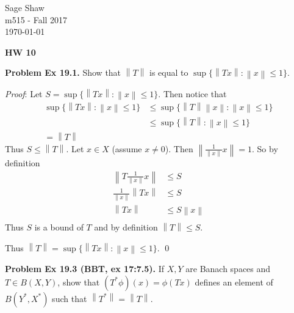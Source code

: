 \documentclass[12pt]{article}
\newcommand{\problem}[1]{\hspace{-4 ex} \large \textbf{Problem #1} }
\newcommand{\norm}[1]{\left\lVert#1\right\rVert}
\renewenvironment{proof}{\hspace{-4 ex} \emph{Proof}:}{\qed}
\begin{document}
	\thispagestyle{empty}
	
	\begin{flushright}
		Sage Shaw \\
		m515 - Fall 2017 \\
		\today
	\end{flushright}
	
{\large \textbf{HW 10}}\bigbreak

\problem{Ex 19.1.} Show that $\norm{T}$ is equal to $\sup\{\norm{Tx}:\norm{x}\leq1\}$. \bigbreak

	\begin{proof}
		Let $S = \sup\{\norm{Tx}:\norm{x}\leq1\}$. Then notice that
		\begin{align*}
			\sup\{\norm{Tx}:\norm{x}\leq1\} & \leq \sup\{\norm{T}\norm{x}:\norm{x}\leq1\} \\
			& \leq \sup\{\norm{T}:\norm{x}\leq1\} \\
			= \norm{T}
		\end{align*}
		Thus $S \leq \norm{T}$. \bigbreak
		Let $x \in X$ (assume $x \neq 0$). Then $\norm{\tfrac{1}{\norm{x}}x} = 1$. So by definition 
		\begin{align*}
			\norm{T\tfrac{1}{\norm{x}}x} & \leq S \\
			\tfrac{1}{\norm{x}} \norm{Tx} & \leq S \\
			\norm{Tx} & \leq S \norm{x} \\
		\end{align*}
		Thus $S$ is a bound of $T$ and by definition $\norm{T} \leq S$. \bigbreak
		
		Thus $\norm{T} = \sup\{\norm{Tx}:\norm{x}\leq1\}$.		
	\end{proof}


\bigbreak
\problem{Ex 19.3 (BBT, ex 17:7.5).} If $X,Y$ are Banach spaces and $T\in B(X,Y)$, show that $(T^*\phi)(x)=\phi(Tx)$ defines an element of $B(Y^*,X^*)$ such that $\norm{T^*}=\norm{T}$. \bigbreak
\end{document}
